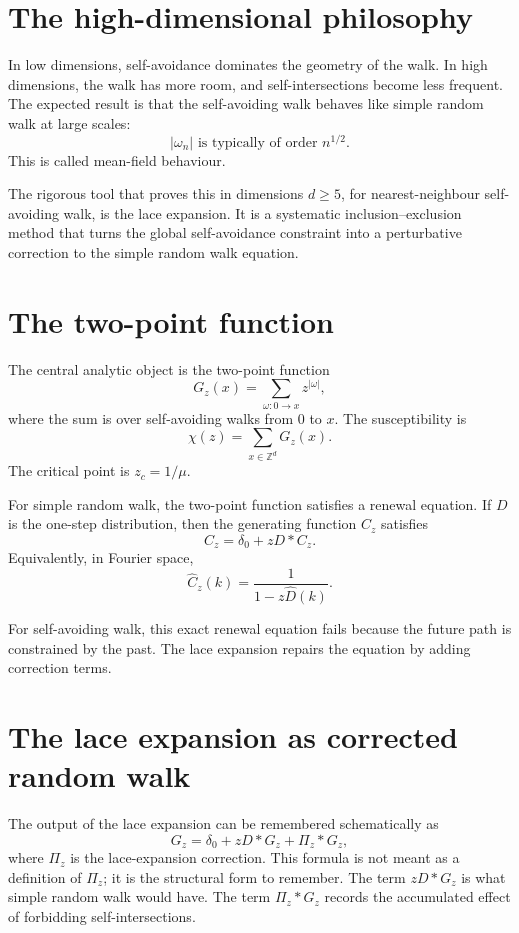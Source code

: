 
\section{The high-dimensional philosophy}

In low dimensions, self-avoidance dominates the geometry of the walk.  In high dimensions, the walk has more room, and self-intersections become less frequent.  The expected result is that the self-avoiding walk behaves like simple random walk at large scales:
\[
  |\omega_n|\text{ is typically of order }n^{1/2}.
\]
This is called mean-field behaviour.

The rigorous tool that proves this in dimensions \(d\ge5\), for nearest-neighbour self-avoiding walk, is the lace expansion.  It is a systematic inclusion--exclusion method that turns the global self-avoidance constraint into a perturbative correction to the simple random walk equation.

\section{The two-point function}

The central analytic object is the two-point function
\[
  G_z(x)=\sum_{\omega:0\to x} z^{|\omega|},
\]
where the sum is over self-avoiding walks from \(0\) to \(x\).  The susceptibility is
\[
  \chi(z)=\sum_{x\in\mathbb Z^d}G_z(x).
\]
The critical point is \(z_c=1/\mu\).

For simple random walk, the two-point function satisfies a renewal equation.  If \(D\) is the one-step distribution, then the generating function \(C_z\) satisfies
\[
  C_z=\delta_0+zD*C_z.
\]
Equivalently, in Fourier space,
\[
  \widehat C_z(k)=\frac1{1-z\widehat D(k)}.
\]

For self-avoiding walk, this exact renewal equation fails because the future path is constrained by the past.  The lace expansion repairs the equation by adding correction terms.

\section{The lace expansion as corrected random walk}

The output of the lace expansion can be remembered schematically as
\[
  G_z=\delta_0+zD*G_z+\Pi_z*G_z,
\]
where \(\Pi_z\) is the lace-expansion correction.  This formula is not meant as a definition of \(\Pi_z\); it is the structural form to remember.  The term \(zD*G_z\) is what simple random walk would have.  The term \(\Pi_z*G_z\) records the accumulated effect of forbidding self-intersections.


